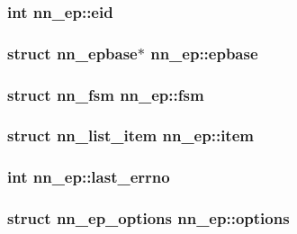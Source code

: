 \subsubsection[{eid}]{\setlength{\rightskip}{0pt plus 5cm}int nn\+\_\+ep\+::eid}\hypertarget{structnn__ep_a16c6bc677912a107ba3a353252e8b09a}{}\label{structnn__ep_a16c6bc677912a107ba3a353252e8b09a}
\subsubsection[{epbase}]{\setlength{\rightskip}{0pt plus 5cm}struct {\bf nn\+\_\+epbase}$\ast$ nn\+\_\+ep\+::epbase}\hypertarget{structnn__ep_af2099da4aa3cfa0d0c795262ff41cc89}{}\label{structnn__ep_af2099da4aa3cfa0d0c795262ff41cc89}
\subsubsection[{fsm}]{\setlength{\rightskip}{0pt plus 5cm}struct {\bf nn\+\_\+fsm} nn\+\_\+ep\+::fsm}\hypertarget{structnn__ep_a5e31919281d05cadde1b39f15d1247c7}{}\label{structnn__ep_a5e31919281d05cadde1b39f15d1247c7}
\subsubsection[{item}]{\setlength{\rightskip}{0pt plus 5cm}struct {\bf nn\+\_\+list\+\_\+item} nn\+\_\+ep\+::item}\hypertarget{structnn__ep_a2e46eb5aa8bd437a60f448d312e21d6e}{}\label{structnn__ep_a2e46eb5aa8bd437a60f448d312e21d6e}
\subsubsection[{last\+\_\+errno}]{\setlength{\rightskip}{0pt plus 5cm}int nn\+\_\+ep\+::last\+\_\+errno}\hypertarget{structnn__ep_a415457d365d9964da0a4ef7627698ad0}{}\label{structnn__ep_a415457d365d9964da0a4ef7627698ad0}
\subsubsection[{options}]{\setlength{\rightskip}{0pt plus 5cm}struct {\bf nn\+\_\+ep\+\_\+options} nn\+\_\+ep\+::options}\hypertarget{structnn__ep_a8b72c5b686aa263c18bb2a3219f2376f}{}\label{structnn__ep_a8b72c5b686aa263c18bb2a3219f2376f}

